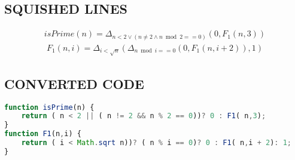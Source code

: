 \documentclass{article}
\begin{document}
\subsection{SQUISHED LINES}
\begin{equation*}\begin{split}
isPrime \left(n \right) = \Delta_{n < 2  \lor   \left(n  \ne  2  \land  n  \bmod{} 2 == 0 \right)} \left(0,F_{1} \left(n,3 \right) \right)
\end{split}\end{equation*}
\begin{equation*}\begin{split}
F_{1} \left(n,i \right) = \Delta_{i < \sqrt{n}} \left(\Delta_{n  \bmod{} i == 0} \left(0,F_{1} \left(n,i + 2 \right) \right),1 \right)
\end{split}\end{equation*}


\subsection{CONVERTED CODE}
\begin{lstlisting}[language=JavaScript]
function isPrime(n) {
    return ( n < 2 || ( n != 2 && n % 2 == 0))? 0 : F1( n,3);
}
function F1(n,i) {
    return ( i < Math.sqrt n))? ( n % i == 0)? 0 : F1( n,i + 2): 1;
}

\end{lstlisting}
\end{document}
